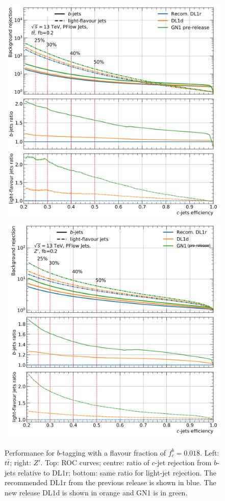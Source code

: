 \begin{figure}[h!]
{  }
  \caption{Performance for $b$-tagging with a flavour fraction of $f^b_c = 0.018$. Left: $t\bar{t}$; right: $Z'$. Top: ROC curves; centre: ratio of $c$-jet rejection from $b$-jets relative to DL1r; bottom: same ratio for light-jet rejection. The recommended DL1r from the previous release is shown in blue. The new release DL1d is shown in orange and GN1 is in green.}
  \label{fig:DL1dtt}
  \bigskip
  \centerline{
  \includegraphics[scale=0.45]{Images/FTAG/DL1d/ROC/ttc.png}
  \includegraphics[scale=0.45]{Images/FTAG/DL1d/ROC/zpc.png}
}
\end{figure}

